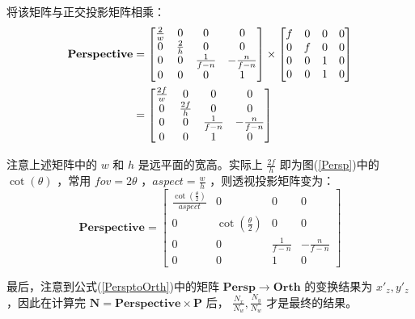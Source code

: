 \documentclass[12pt,oneside,a4paper]{ctexart}
\begin{document}
将该矩阵与正交投影矩阵相乘：
\begin{align}
	\mathbf{Perspective} & =
	\begin{bmatrix}
		\frac{2}{w} & 0           & 0             & 0              \\
		0           & \frac{2}{h} & 0             & 0              \\
		0           & 0           & \frac{1}{f-n} & -\frac{n}{f-n} \\
		0           & 0           & 0             & 1
	\end{bmatrix}
	\times
	\begin{bmatrix}
		f & 0 & 0 & 0 \\
		0 & f & 0 & 0 \\
		0 & 0 & 1 & 0 \\
		0 & 0 & 1 & 0 \\
	\end{bmatrix} \notag \\
	                     & =
	\begin{bmatrix}
		\frac{2f}{w} & 0            & 0             & 0              \\
		0            & \frac{2f}{h} & 0             & 0              \\
		0            & 0            & \frac{1}{f-n} & -\frac{n}{f-n} \\
		0            & 0            & 1             & 0
	\end{bmatrix}\notag
\end{align}

注意上述矩阵中的 $w$ 和 $h$ 是远平面的宽高。实际上 $\frac{2f}{h}$ 即为图(\ref{Persp})中的 $\cot(\theta)$ ，常用 $fov=2\theta$ ，$aspect=\frac{w}{h}$ ，则透视投影矩阵变为：
\begin{equation*}
	\mathbf{Perspective} =
	\begin{bmatrix}
		\frac{\cot(\frac{\theta}{2})}{aspect} & 0                      & 0             & 0              \\
		0                                     & \cot(\frac{\theta}{2}) & 0             & 0              \\
		0                                     & 0                      & \frac{1}{f-n} & -\frac{n}{f-n} \\
		0                                     & 0                      & 1             & 0
	\end{bmatrix}
\end{equation*}

最后，注意到公式(\ref{PersptoOrth})中的矩阵 $\mathbf{Persp}\rightarrow\mathbf{Orth}$ 的变换结果为 $x'_z, y'_z$ ，因此在计算完 $\mathbf{N}=\mathbf{Perspective}\times\mathbf{P}$ 后， $\frac{N_x}{N_w}, \frac{N_y}{N_w}$ 才是最终的结果。
\end{document}
